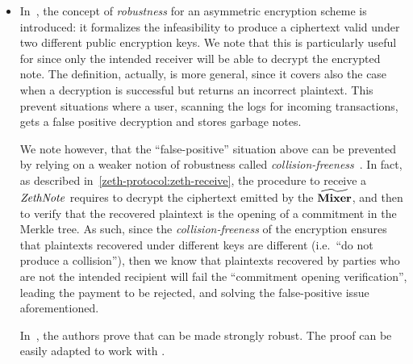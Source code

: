 \begin{itemize}
    \item In~\cite{abdalla2010robust}, the concept of \emph{robustness} for an asymmetric encryption scheme is introduced: it formalizes the infeasibility to produce a ciphertext valid under two different public encryption keys. We note that this is particularly useful for \zeth{} since only the intended receiver will be able to decrypt the encrypted note. The definition, actually, is more general, since it covers also the case when a decryption is successful but returns an incorrect plaintext. This prevent situations where a user, scanning the \mixer{} logs for incoming transactions, gets a false positive decryption and stores garbage notes.
    \begin{notebox}
        We note however, that the ``false-positive'' situation above can be prevented by relying on a weaker notion of robustness called \emph{collision-freeness}~\cite{asiacrypt-2010-23840}. In fact, as described in~\cref{zeth-protocol:zeth-receive}, the procedure to receive a $\mathit{ZethNote}$ requires to decrypt the ciphertext emitted by the $\widetilde{\mathbf{Mixer}}$, and then to verify that the recovered plaintext is the opening of a commitment in the Merkle tree.
        As such, since the \emph{collision-freeness} of the encryption ensures that plaintexts recovered under different keys are different (i.e.~``do not produce a collision''), then we know that plaintexts recovered by parties who are not the intended recipient will fail the ``commitment opening verification'', leading the payment to be rejected, and solving the false-positive issue aforementioned.
    \end{notebox}
In~\cite[Section 6]{abdalla2010robust}, the authors prove that \dhies{} can be made strongly robust. The proof can be easily adapted to work with \dhaes{}.

\end{itemize}
